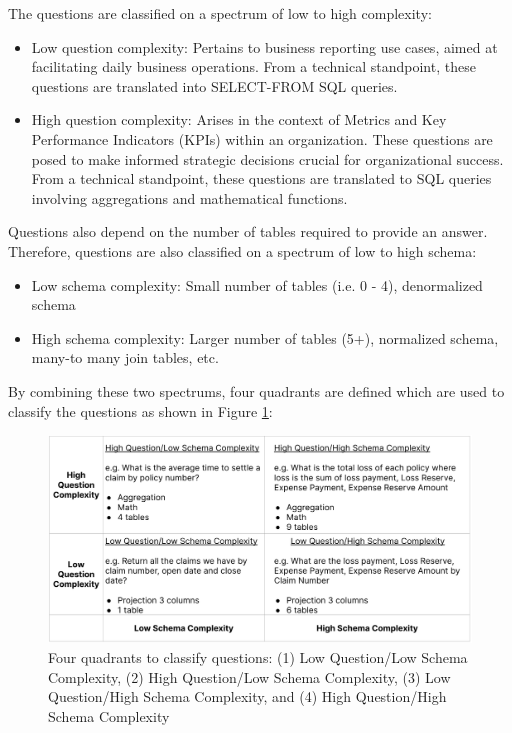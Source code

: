 \documentclass[11pt]{article}
\begin{document}
The questions are classified on a spectrum of low to high complexity:
\begin{itemize}
    \item Low question complexity: Pertains to business reporting use cases, aimed at facilitating daily business operations. From a technical standpoint, these questions are translated into SELECT-FROM SQL queries.
    \item High question complexity: Arises in the context of Metrics and Key Performance Indicators (KPIs) within an organization. These questions are posed to make informed strategic decisions crucial for organizational success. From a technical standpoint, these questions are translated to SQL queries involving aggregations and mathematical functions. 

\end{itemize}

Questions also depend on the number of tables required to provide an answer. Therefore, questions are also classified on a spectrum of low to high schema:
\begin{itemize}
    \item Low schema complexity: Small number of tables (i.e. 0 - 4), denormalized schema
    \item High schema complexity: Larger number of tables (5+), normalized schema, many-to many join tables, etc.	
\end{itemize}

	
By combining these two spectrums, four quadrants are defined which are used to classify the questions as shown in Figure \ref{fig:question_quadrant}: 

\begin{figure}[hbtp]
\centering
\includegraphics[width=\linewidth]{submissions/Juan2024/results/question_quadrant.png}
\caption{Four quadrants to classify questions: (1) Low Question/Low Schema Complexity, (2) High Question/Low Schema Complexity, (3) Low Question/High Schema Complexity, and (4) High Question/High Schema Complexity}
\label{fig:question_quadrant}
\end{figure}
\end{document}
